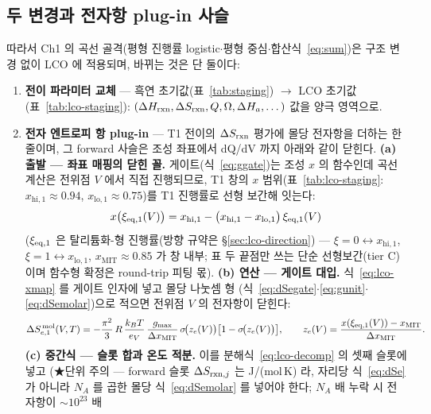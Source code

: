 \subsection{두 변경과 전자항 plug-in 사슬}\label{sec:lco-code-plugin}
따라서 Ch1 의 곡선 골격(평형 진행률 logistic$\cdot$평형 중심$\cdot$합산식~\eqref{eq:sum})은 구조 변경 없이
LCO 에 적용되며, 바뀌는 것은 단 둘이다:
\begin{enumerate}[label=(\roman*),leftmargin=2.2em,itemsep=1pt]
\item \textbf{전이 파라미터 교체} --- 흑연 초기값(표~\ref{tab:staging}) $\to$ LCO 초기값(표~\ref{tab:lco-staging}):
$(\Delta H_{\mathrm{rxn}},\Delta S_{\mathrm{rxn}},Q,\Omega,\Delta H_a,\dots)$ 값을 양극 영역으로.
\item \textbf{전자 엔트로피 항 plug-in} --- T1 전이의 $\Delta S_{\mathrm{rxn}}$ 평가에 몰당 전자항을 더하는 한 줄이며,
그 forward 사슬은 조성 좌표에서 dQ/dV 까지 아래와 같이 닫힌다.
\textbf{(a) 출발 --- 좌표 매핑의 닫힌 꼴.} 게이트(식~\eqref{eq:ggate})는 조성 $x$ 의 함수인데 곡선 계산은
전위점 $V$ 에서 직접 진행되므로, T1 창의 $x$ 범위(표~\ref{tab:lco-staging}: $x_{\mathrm{hi},1}{\approx}0.94$,
$x_{\mathrm{lo},1}{\approx}0.75$)를 T1 진행률로 선형 보간해 잇는다:
\begin{equation}
x\big(\xi_{\mathrm{eq},1}(V)\big)=x_{\mathrm{hi},1}-\big(x_{\mathrm{hi},1}-x_{\mathrm{lo},1}\big)\,\xi_{\mathrm{eq},1}(V)
\label{eq:lco-xmap}
\end{equation}
($\xi_{\mathrm{eq},1}$ 은 탈리튬화-형 진행률(방향 규약은 \S\ref{sec:lco-direction}) --- $\xi{=}0\leftrightarrow x_{\mathrm{hi},1}$, $\xi{=}1\leftrightarrow x_{\mathrm{lo},1}$, $x_\mathrm{MIT}{\approx}0.85$ 가 창 내부; 표 두 끝점만 쓰는 단순 선형보간(tier C)이며 함수형 확정은 round-trip 피팅 몫).
\textbf{(b) 연산 --- 게이트 대입.} 식~\eqref{eq:lco-xmap} 를 게이트 인자에 넣고 몰당 나눗셈 형
(식~\eqref{eq:dSegate}$\cdot$\eqref{eq:gunit}$\cdot$\eqref{eq:dSemolar})으로 적으면 전위점 $V$ 의
전자항이 닫힌다:
\begin{equation}
\Delta S_{e,1}^{\,\mathrm{mol}}(V,T)
=-\frac{\pi^2}{3}\,R\,\frac{k_BT}{e_V}\,\frac{g_{\max}}{\Delta x_\mathrm{MIT}}\,
\sigma\!\big(z_e(V)\big)\big[1-\sigma\!\big(z_e(V)\big)\big],
\qquad z_e(V)=\frac{x(\xi_{\mathrm{eq},1}(V))-x_\mathrm{MIT}}{\Delta x_\mathrm{MIT}}.
\label{eq:lco-SeV}
\end{equation}
\textbf{(c) 중간식 --- 슬롯 합과 온도 적분.} 이를 분해식~\eqref{eq:lco-decomp} 의 셋째 슬롯에 넣고
(★단위 주의 --- forward 슬롯 $\Delta S_{\mathrm{rxn},j}$ 는 J/(mol\,K) 라, 자리당 식~\eqref{eq:dSe} 가 아니라
$N_A$ 를 곱한 몰당 식~\eqref{eq:dSemolar} 를 넣어야 한다; $N_A$ 배 누락 시 전자항이 $\sim10^{23}$ 배

\end{enumerate}
